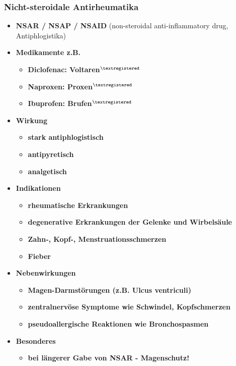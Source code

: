 \subsubsection{Nicht-steroidale Antirheumatika}
	\begin{itemize}
		\item \textbf{NSAR / NSAP / NSAID} (non-steroidal anti-inflammatory drug, Antiphlogistika)
		\item \textbf{Medikamente z.B.}
			\begin{itemize}
				\item \textbf{Diclofenac: Voltaren$^{\textregistered}$}
				\item \textbf{Naproxen: Proxen$^{\textregistered}$}
				\item \textbf{Ibuprofen: Brufen$^{\textregistered}$}
			\end{itemize}
		\item \textbf{Wirkung}
			\begin{itemize}
				\item \textbf{stark antiphlogistisch}
				\item \textbf{antipyretisch}
				\item \textbf{analgetisch}
			\end{itemize}
		\item \textbf{Indikationen}
			\begin{itemize}
				\item \textbf{rheumatische Erkrankungen}
				\item \textbf{degenerative Erkrankungen der Gelenke und Wirbelsäule}
				\item \textbf{Zahn-, Kopf-, Menstruationsschmerzen}
				\item \textbf{Fieber}
			\end{itemize}
		\item \textbf{Nebenwirkungen}
			\begin{itemize}
				\item \textbf{Magen-Darmstörungen (z.B. Ulcus ventriculi)}
				\item \textbf{zentralnervöse Symptome wie Schwindel, Kopfschmerzen}
				\item \textbf{pseudoallergische Reaktionen wie Bronchospasmen}
			\end{itemize}
		\item \textbf{Besonderes}
			\begin{itemize}
				\item \textbf{bei längerer Gabe von NSAR - Magenschutz!}
			\end{itemize}
	\end{itemize}
		
